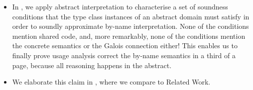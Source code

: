 \begin{itemize}
\item In , we apply abstract interpretation to characterise
  a set of soundness conditions that the type class instances of an abstract
  domain must satisfy in order to soundly approximate by-name interpretation.
  None of the conditions mention shared code, and, more remarkably, none of the
  conditions mention the concrete semantics or the Galois connection either!
  This enables us to finally prove usage analysis correct \wrt the by-name
  semantics in a third of a page, because all reasoning happens in the abstract.
\item
  We elaborate this claim in , where we compare to
  Related Work.
\end{itemize}


